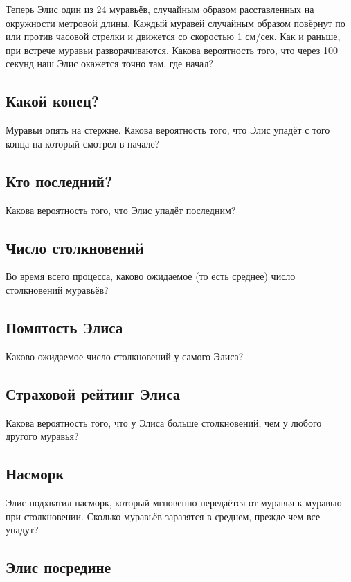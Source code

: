 Теперь Элис один из 24 муравьёв, случайным образом расставленных на окружности метровой длины.
Каждый муравей случайным образом повёрнут по или против часовой стрелки и движется со скоростью 1 см/сек.
Как и раньше, при встрече муравьи разворачиваются.
Какова вероятность того, что через 100 секунд наш Элис окажется точно там, где начал?

\subsection*{Какой конец?}

Муравьи опять на стержне.
Какова вероятность того, что Элис упадёт с того конца на который смотрел в начале?

\subsection*{Кто последний?}

Какова вероятность того, что Элис упадёт последним?

\subsection*{Число столкновений}

Во время всего процесса, каково ожидаемое (то есть среднее) число столкновений муравьёв?

\subsection*{Помятость Элиса}

Каково ожидаемое число столкновений у самого Элиса?

\subsection*{Страховой рейтинг Элиса}

Какова вероятность того, что у Элиса больше столкновений, чем у любого другого муравья?

\subsection*{Насморк}

Элис подхватил насморк, который мгновенно передаётся от муравья к муравью при столкновении.
Сколько муравьёв заразятся в среднем, прежде чем все упадут?

\subsection*{Элис посредине}

